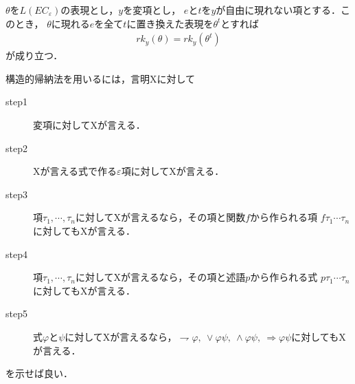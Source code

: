 	\begin{screen}
		\begin{metathm}[階数定理]
			$\theta$を$L(EC_{\varepsilon})$の表現とし，$y$を変項とし，
			$e$と$t$を$y$が自由に現れない項とする．このとき，
			$\theta$に現れる$e$を全て$t$に置き換えた表現を$\theta^{t}$とすれば
			\begin{align}
				rk_{y}(\theta) = rk_{y}(\theta^{t})
			\end{align}
			が成り立つ．
		\end{metathm}
	\end{screen}
	
	構造的帰納法を用いるには，言明Xに対して
	\begin{description}
		\item[step1] 変項に対してXが言える．
		\item[step2] Xが言える式で作る$\varepsilon$項に対してXが言える．
		\item[step3] 項$\tau_{1},\cdots,\tau_{n}$に対してXが言えるなら，その項と関数$f$から作られる項
			$f\tau_{1}\cdots\tau_{n}$に対してもXが言える．
		\item[step4] 項$\tau_{1},\cdots,\tau_{n}$に対してXが言えるなら，その項と述語$p$から作られる式
			$p\tau_{1}\cdots\tau_{n}$に対してもXが言える．
		\item[step5] 式$\varphi$と$\psi$に対してXが言えるなら，$\rightharpoondown \varphi,\ \vee \varphi \psi,\
			\wedge \varphi \psi,\ \Longrightarrow \varphi \psi$に対してもXが言える．
	\end{description}
	を示せば良い．
	
